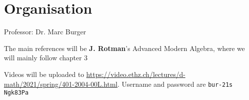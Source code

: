 \setcounter{section}{-1}
\section*{Organisation}

Professor: Dr. Marc Burger 

The main references will be \textbf{J. Rotman}'s Advanced Modern Algebra, where we will mainly follow chapter 3

Videos will be uploaded to \url{https://video.ethz.ch/lectures/d-math/2021/spring/401-2004-00L.html}. Username and password are \texttt{bur-21s} \texttt{Ngk83Pa}



